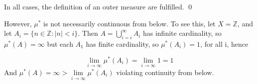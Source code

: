 \documentclass[11pt,oneside]{article}
\numberwithin{equation}{section}
\theoremstyle{definition}
\def\ZZ{\mathbb{Z}}
\begin{document}
\begin{solution}
\begin{enumerate}[(a)]
      In all cases, the definition of an outer measure are fulfilled.
      \qed
      
  \end{enumerate}

  However, $\mu ^*$ is not necessarily continuous from below.  To see
  this, let $X = \ZZ$, and let $A_i = \{ n \in \ZZ : |n| < i \}$.
  Then $A = \bigcup \limits _ { i=i } ^ \infty A_i$ has infinite
  cardinality, so $\mu ^* ( A) = \infty$ but each $A_1$ has finite
  cardinality, so $\mu ^*(A_i) = 1$, for all i, hence

  $$ \lim _ { i \to \infty } \mu ^* (A_i) = \lim _ { i \to \infty} 1 = 1
  $$
  And $ \mu^* ( A) = \infty > \lim \limits_{ i \to \infty } \mu ^* (A_i)$ violating
  continuity from below.  
  
\end{solution}
\end{document}
